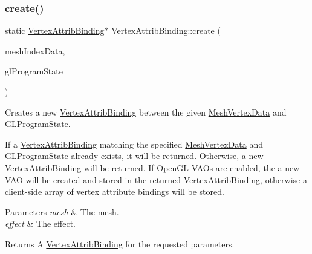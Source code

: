 \subsubsection{\texorpdfstring{create()}{create()}\hspace{0.1cm}{\footnotesize\ttfamily [2/2]}}
{\footnotesize\ttfamily static \hyperlink{classVertexAttribBinding}{Vertex\+Attrib\+Binding}$\ast$ Vertex\+Attrib\+Binding\+::create (\begin{DoxyParamCaption}\item[{\hyperlink{classMeshIndexData}{Mesh\+Index\+Data} $\ast$}]{mesh\+Index\+Data,  }\item[{\hyperlink{classGLProgramState}{G\+L\+Program\+State} $\ast$}]{gl\+Program\+State }\end{DoxyParamCaption})\hspace{0.3cm}{\ttfamily [static]}}

Creates a new \hyperlink{classVertexAttribBinding}{Vertex\+Attrib\+Binding} between the given \hyperlink{classMeshVertexData}{Mesh\+Vertex\+Data} and \hyperlink{classGLProgramState}{G\+L\+Program\+State}.

If a \hyperlink{classVertexAttribBinding}{Vertex\+Attrib\+Binding} matching the specified \hyperlink{classMeshVertexData}{Mesh\+Vertex\+Data} and \hyperlink{classGLProgramState}{G\+L\+Program\+State} already exists, it will be returned. Otherwise, a new \hyperlink{classVertexAttribBinding}{Vertex\+Attrib\+Binding} will be returned. If Open\+GL V\+A\+Os are enabled, the a new V\+AO will be created and stored in the returned \hyperlink{classVertexAttribBinding}{Vertex\+Attrib\+Binding}, otherwise a client-\/side array of vertex attribute bindings will be stored.


\begin{DoxyParams}{Parameters}
{\em mesh} & The mesh. \\
\hline
{\em effect} & The effect.\\
\hline
\end{DoxyParams}
\begin{DoxyReturn}{Returns}
A \hyperlink{classVertexAttribBinding}{Vertex\+Attrib\+Binding} for the requested parameters. 
\end{DoxyReturn}
\mbox{\label{classVertexAttribBinding_a686c067940b41b7db64d5103dc624799}} 
